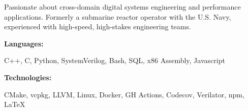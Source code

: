 \documentclass[9pt]{developercv} %
\begin{document}
\begin{minipage}[t]{0.46\textwidth}
	\vspace{-6pt}

	Passionate about cross-domain digital systems engineering and performance
	applications. Formerly a submarine reactor operator with the U.S. Navy,
	experienced with high-speed, high-stakes engineering teams.
\end{minipage}
\hfill %
\begin{minipage}[t]{0.465\textwidth}
	\vspace{-6pt}

	\begin{minipage}[t]{0.2\textwidth}
		\textbf{Languages:}
	\end{minipage}
	\hfill
	\begin{minipage}[t]{0.73\textwidth}
		C++, C, Python, SystemVerilog, Bash, SQL, x86 Assembly, Javascript
	\end{minipage}
	\vspace{4mm}

	\begin{minipage}[t]{0.2\textwidth}
		\textbf{Technologies:}
	\end{minipage}
	\hfill
	\begin{minipage}[t]{0.73\textwidth}
		CMake, vcpkg, LLVM, Linux, Docker, GH Actions, Codecov, Verilator, npm, LaTeX
	\end{minipage}

\end{minipage}
\end{document}
